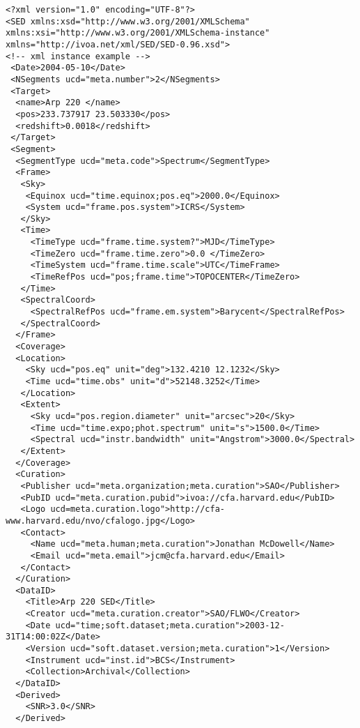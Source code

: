 \documentclass[11pt]{article}
\newenvironment{fmpage}
     {\begin{lrbox}{\fmbox}\begin{minipage}{6.5in}}
     {\end{minipage}\end{lrbox}\colorbox{iblue}{\fbox{\usebox{\fmbox}}}}
\begin{document}
{ \footnotesize
\begin{flushleft}


\begin{fmpage}



\begin{verbatim}
<?xml version="1.0" encoding="UTF-8"?>
<SED xmlns:xsd="http://www.w3.org/2001/XMLSchema" xmlns:xsi="http://www.w3.org/2001/XMLSchema-instance" 
xmlns="http://ivoa.net/xml/SED/SED-0.96.xsd">
<!-- xml instance example -->
 <Date>2004-05-10</Date>
 <NSegments ucd="meta.number">2</NSegments>
 <Target>
  <name>Arp 220 </name>
  <pos>233.737917 23.503330</pos>
  <redshift>0.0018</redshift>  
 </Target>
 <Segment>
  <SegmentType ucd="meta.code">Spectrum</SegmentType>
  <Frame>
   <Sky>
    <Equinox ucd="time.equinox;pos.eq">2000.0</Equinox>
    <System ucd="frame.pos.system">ICRS</System>
   </Sky>
   <Time>
     <TimeType ucd="frame.time.system?">MJD</TimeType> 
     <TimeZero ucd="frame.time.zero">0.0 </TimeZero>
     <TimeSystem ucd="frame.time.scale">UTC</TimeFrame> 
     <TimeRefPos ucd="pos;frame.time">TOPOCENTER</TimeZero>
   </Time>
   <SpectralCoord>
     <SpectralRefPos ucd="frame.em.system">Barycent</SpectralRefPos>
   </SpectralCoord>
  </Frame>
  <Coverage>
  <Location>
    <Sky ucd="pos.eq" unit="deg">132.4210 12.1232</Sky>
    <Time ucd="time.obs" unit="d">52148.3252</Time>
   </Location>
   <Extent>
     <Sky ucd="pos.region.diameter" unit="arcsec">20</Sky>
     <Time ucd="time.expo;phot.spectrum" unit="s">1500.0</Time>
     <Spectral ucd="instr.bandwidth" unit="Angstrom">3000.0</Spectral>
   </Extent>
  </Coverage>
  <Curation>
   <Publisher ucd="meta.organization;meta.curation">SAO</Publisher>
   <PubID ucd="meta.curation.pubid">ivoa://cfa.harvard.edu</PubID>
   <Logo ucd=meta.curation.logo">http://cfa-www.harvard.edu/nvo/cfalogo.jpg</Logo>
   <Contact>
     <Name ucd="meta.human;meta.curation">Jonathan McDowell</Name>
     <Email ucd="meta.email">jcm@cfa.harvard.edu</Email>
   </Contact>
  </Curation>
  <DataID>
    <Title>Arp 220 SED</Title>
    <Creator ucd="meta.curation.creator">SAO/FLWO</Creator>
    <Date ucd="time;soft.dataset;meta.curation">2003-12-31T14:00:02Z</Date>
    <Version ucd="soft.dataset.version;meta.curation">1</Version>
    <Instrument ucd="inst.id">BCS</Instrument>
    <Collection>Archival</Collection>
  </DataID>
  <Derived>
    <SNR>3.0</SNR>
  </Derived>
\end{verbatim}
\end{fmpage}


\end{flushleft}}
\end{document}
